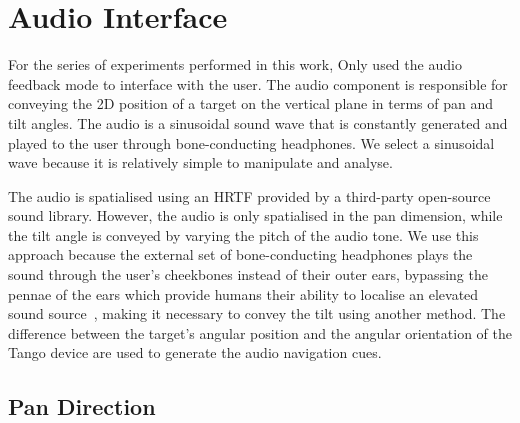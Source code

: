 \documentclass[format=sigconf, review=true, screen=true, anonymous=true]{acmart}
\begin{document}
\section{Audio Interface}
\label{sec:interface}

For the series of experiments performed in this work, Only used the audio feedback mode to interface with the user. The audio component is responsible for conveying the 2D position of a target on the vertical plane in terms of pan and tilt angles. 
The audio is a sinusoidal sound wave that is constantly generated and played to the user through bone-conducting headphones. We select a sinusoidal wave because it is relatively simple to manipulate and analyse. %

The audio is spatialised using an HRTF provided by a third-party open-source sound library. However, the audio is only spatialised in the pan dimension, while the tilt angle is conveyed by varying the pitch of the audio tone. We use this approach because the external set of bone-conducting headphones plays the sound through the user's cheekbones instead of their outer ears, bypassing the pennae of the ears which provide humans their ability to localise an elevated sound source~\cite{roffler1968factors, algazi2001elevation}, making it necessary to convey the tilt using another method. The difference between the target's angular position and the angular orientation of the Tango device are used to generate the audio navigation cues. %

\subsection{Pan Direction}
\end{document}
